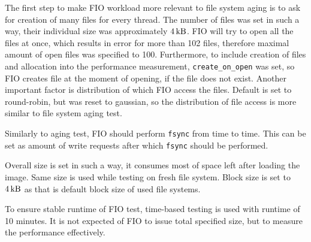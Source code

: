 \documentclass[
  color, %
  table, %
  lof,   %
  lot,   %
]{fithesis3}
\begin{document}
The first step to make FIO workload more relevant to file system aging is to ask for creation of many files for every thread. The number of files was set in such a way, their individual size was approximately $\SI{4}{\kilo\byte}$. FIO will try to open all the files at once, which results in error for more than 102 files, therefore maximal amount of open files was specified to 100. Furthermore, to include creation of files and allocation into the performance measurement, \texttt{create\_on\_open} was set, so FIO creates file at the moment of opening, if the file does not exist. Another important factor is distribution of which FIO access the files. Default is set to round-robin, but was reset to gaussian, so the distribution of file access is more similar to file system aging test.

Similarly to aging test, FIO should perform \texttt{fsync} from time to time. This can be set as amount of write requests after which \texttt{fsync} should be performed.

Overall size is set in such a way, it consumes most of space left after loading the image. Same size is used while testing on fresh file system. Block size is set to $\SI{4}{\kilo\byte}$ as that is default block size of used file systems.

To ensure stable runtime of FIO test, time-based testing is used with runtime of 10 minutes. It is not expected of FIO to issue total specified size, but to measure the performance effectively.




\end{document}

